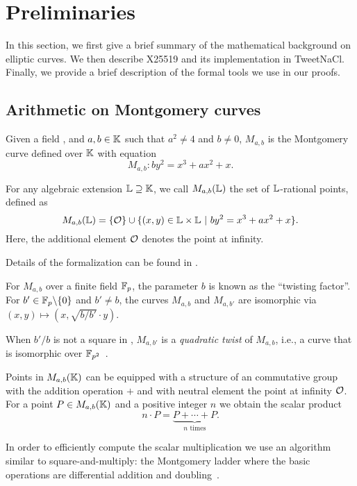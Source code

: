 \section{Preliminaries}
\label{sec:preliminaries}

In this section, we first give a brief summary of the mathematical background
on elliptic curves. We then describe X25519 and its implementation in TweetNaCl.
Finally, we provide a brief description of the formal tools we use in our proofs.


\subsection{Arithmetic on Montgomery curves}
\label{subsec:arithmetic-montgomery}

\begin{dfn}
  Given a field \K, and $a,b \in \mathbb{K}$ such that $a^2 \neq 4$ and $b \neq 0$,
  $M_{a,b}$ is the Montgomery curve defined over $\mathbb{K}$ with equation
  $$M_{a,b}: by^2 = x^3 + ax^2 + x.$$
\end{dfn}

\begin{dfn}
  For any algebraic extension $\mathbb{L} \supseteq	\mathbb{K}$, we call
  $M_{a,b}(\mathbb{L})$ the set of $\mathbb{L}$-rational points, defined as
  $$M_{a,b}(\mathbb{L}) = \{\mathcal{O}\} \cup \{(x,y) \in \mathbb{L} \times \mathbb{L}~|~by^2 = x^3 + ax^2 + x\}.$$
  Here, the additional element $\mathcal{O}$ denotes the point at infinity.
\end{dfn}
Details of the formalization can be found in .

For $M_{a,b}$ over a finite field $\mathbb{F}_{p}$, the parameter $b$ is known as the ``twisting factor''.
For $b'\in \mathbb{F}_{p}\backslash\{0\}$ and $b' \neq b$, the curves $M_{a,b}$ and $M_{a,b'}$
are isomorphic via $(x,y) \mapsto (x, \sqrt{b/b'} \cdot y)$.

\begin{dfn}
  When $b'/b$ is not a square in , $M_{a,b'}$ is a \emph{quadratic twist} of $M_{a,b}$, i.e.,
  a curve that is isomorphic over $\mathbb{F}_{p^2}$~\cite{cryptoeprint:2017:212}.
\end{dfn}

Points in $M_{a,b}(\mathbb{K})$ can be equipped with a structure of an commutative group
with the addition operation $+$ and with neutral element the point at infinity $\mathcal{O}$.
For a point $P \in M_{a,b}(\mathbb{K})$ and a positive integer $n$ we obtain the scalar product
$$n\cdot P = \underbrace{P + \cdots + P}_{n\text{ times}}.$$

In order to efficiently compute the scalar multiplication we use an algorithm
similar to square-and-multiply: the Montgomery ladder where the basic operations
are differential addition and doubling~\cite{MontgomerySpeeding}.

